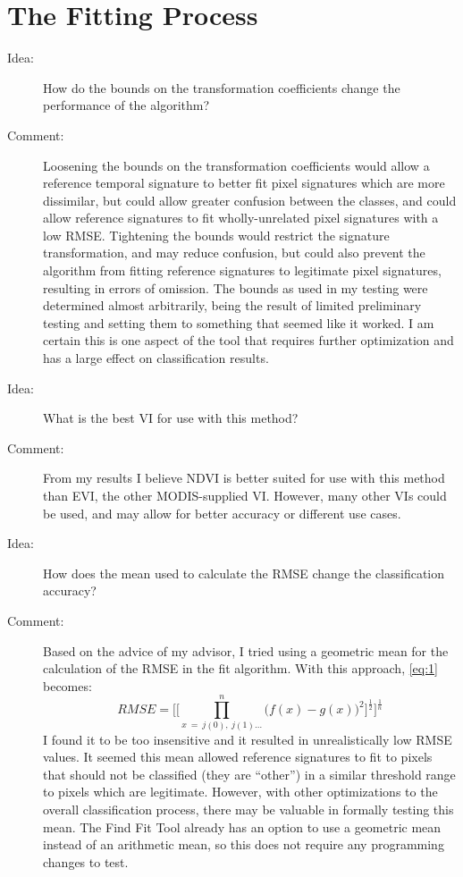\section{The Fitting Process}
\label{appendix:future:fitting}

\begin{description}
\item[Idea:] How do the bounds on the transformation coefficients change the performance of the algorithm?

\item[Comment:] Loosening the bounds on the transformation coefficients would allow a reference temporal signature to better fit pixel signatures which are more dissimilar, but could allow greater confusion between the classes, and could allow reference signatures to fit wholly-unrelated pixel signatures with a low RMSE. Tightening the bounds would restrict the signature transformation, and may reduce confusion, but could also prevent the algorithm from fitting reference signatures to legitimate pixel signatures, resulting in errors of omission. The bounds as used in my testing were determined  almost arbitrarily, being the result of limited preliminary testing and setting them to something that seemed like it worked. I am certain this is one aspect of the tool that requires further optimization and has a large effect on classification results.

\item[Idea:] What is the best VI for use with this method?

\item[Comment:] From my results I believe NDVI is better suited for use with this method than EVI, the other MODIS-supplied VI. However, many other VIs could be used, and may allow for better accuracy or different use cases.

\item[Idea:] How does the mean used to calculate the RMSE change the classification accuracy?

\item[Comment:] Based on the advice of my advisor, I tried using a geometric mean for the calculation of the RMSE in the fit algorithm. With this approach, \autoref{eq:1} becomes:
\begin{equation}
\label{eq:geometricmean}
  RMSE = \Biggl[\biggl[\prod_{x\ =\ j(0),\ j(1)\ldots}^{n}\bigl(f\left(x\right)-g\left(x\right)\bigr)^{2}\biggr]^{\frac{1}{2}}\Biggr]^{\frac{1}{n}}
\end{equation}
I found it to be too insensitive and it resulted in unrealistically low RMSE values. It seemed this mean allowed reference signatures to fit to pixels that should not be classified (they are ``other'') in a similar threshold range to pixels which are legitimate. However, with other optimizations to the overall classification process, there may be valuable in formally testing this mean. The Find Fit Tool already has an option to use a geometric mean instead of an arithmetic mean, so this does not require any programming changes to test.


\end{description}
